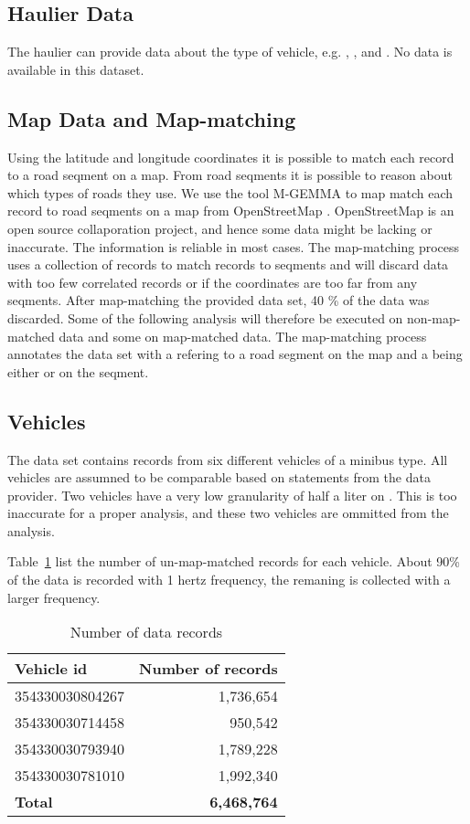 \subsection{Haulier Data}
The haulier can provide data about the type of vehicle, e.g. , ,  and .
No data is available in this dataset.    

\subsection{Map Data and Map-matching}
Using the latitude and longitude coordinates it is possible to match each record to a road seqment on a map.
From road seqments it is possible to reason about which types of roads they use.
We use the tool M-GEMMA \cite{M-GEMMA} to map match each record to road seqments on a map from OpenStreetMap \cite{}.
OpenStreetMap is an open source collaporation project, and hence some data might be lacking or inaccurate. 
The information is reliable in most cases.
The map-matching process uses a collection of records to match records to seqments and will discard data with too few correlated records or if the coordinates are too far from any seqments.
After map-matching the provided data set, 40 \% of the data was discarded. %
Some of the following analysis will therefore be executed on non-map-matched data and some on map-matched data. 
The map-matching process annotates the data set with a  refering to a road segment on the map and a  being either  or  on the seqment.


\subsection{Vehicles} \label{sec:dataDescriptionVehicles}
The data set contains records from six different vehicles of a minibus type. 
All vehicles are assumned to be comparable based on statements from the data provider. %
Two vehicles have a very low granularity of half a liter on . 
This is too inaccurate for a proper analysis, and these two vehicles are ommitted from the analysis.  

Table~\ref{tb:NoRecords} list the number of un-map-matched records for each vehicle. 
About 90\% of the data is recorded with 1 hertz frequency, the remaning is collected with a larger frequency.
\begin{table}
\centering
\begin{tabular}{l|r}
Vehicle id		& Number of records \\\hline
354330030804267 & 1,736,654\\\hline
354330030714458 & 950,542\\\hline
354330030793940 & 1,789,228\\\hline
354330030781010 & 1,992,340\\\hline
\textbf{Total}	& \textbf{6,468,764}
\end{tabular}
\caption{Number of data records}
\label{tb:NoRecords}
\end{table}